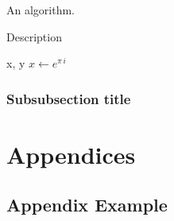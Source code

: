 \documentclass[a4paper]{article}
\begin{document}
An algorithm.
\begin{algorithm}[H]
\caption{Description}
\begin{algorithmic}[1]
 {x, y} 
\State $x\leftarrow e^{\pi\, i}$
\State
{}
\State
\EndIf
\EndProcedure
\end{algorithmic}
\end{algorithm}


\subsubsection{Subsubsection title}



\newpage
\appendix

\section{Appendices}

\newpage
\subsection{Appendix Example}




\newpage
\printbibliography
\end{document}
